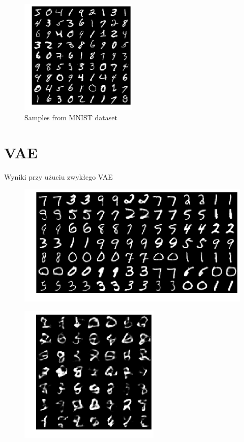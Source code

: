 \documentclass[polish,inz,shortabstract, declaration]{iithesis}
\begin{document}
\begin{figure}[h]
    \centering
    \includegraphics[width=0.5\textwidth]{mnist}
    \caption{Samples from MNIST dataset}
    \label{fig:mnist}
\end{figure}

\section{VAE}

Wyniki przy użuciu zwykłego VAE

\begin{figure}[h]
    \centering
    \includegraphics[width=1.0\textwidth]{mnist_recon}
    \caption{}
    \label{fig:mnist_recon}
\end{figure}

\begin{figure}[h]
    \centering
    \includegraphics[width=0.6\textwidth]{images/mnist_gen.png}
    \caption{}
    \label{fig:mnist_gen}
\end{figure}
\end{document}
